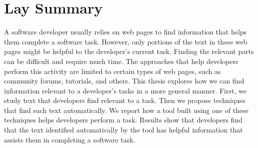 

\chapter*{Lay Summary}

A software developer usually relies on web pages to find information that helps them complete a software task. 
However, only portions of the text in these web pages might be helpful to the developer's current task.
Finding the relevant parts can be difficult and require much time. The approaches that help developers perform this activity are limited to certain types of web pages, such as community forums, tutorials, and others. 
This thesis explores how we can find information relevant to a developer's tasks in a more general manner. 
First, we study text that developers find relevant to a task. 
Then we propose techniques that find such text automatically. 
We report how a tool built using one of these techniques helps developers perform a task. 
Results show that developers find that the text  identified automatically by the tool has helpful information that assists them in completing a software task.
